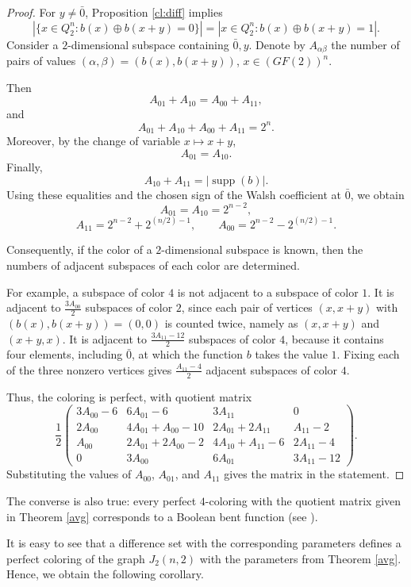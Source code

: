 \documentclass[11pt]{article}
\theoremstyle{definition}
\begin{document}
{{{\begin{proof}
For $y\ne\bar 0$, Proposition \ref{cl:diff}  implies
\[
|\{x\in Q_2^n:b(x)\oplus b(x+y)=0\}|
=
|{x\in Q_2^n:b(x)\oplus b(x+y)=1}|.
\]
Consider a $2$-dimensional subspace containing ${\bar 0,y}$. Denote by $A_{\alpha\beta}$ the number of pairs of values
$(\alpha,\beta)=(b(x),b(x+y))$,
$x\in (GF(2))^n$.

Then
\[
A_{01}+A_{10}=A_{00}+A_{11},
\]
and
\[
A_{01}+A_{10}+A_{00}+A_{11}=2^n.
\]
Moreover, by the change of variable $x\mapsto x+y$,
\[
A_{01}=A_{10}.
\]
Finally,
\[
A_{10}+A_{11}=|\operatorname{supp}(b)|.
\]
Using these equalities and the chosen sign of the Walsh coefficient at $\bar 0$, we obtain
\[
A_{01}=A_{10}=2^{n-2},
\]
\[
A_{11}=2^{n-2}+2^{(n/2)-1},
\qquad
A_{00}=2^{n-2}-2^{(n/2)-1}.
\]

Consequently, if the color of a $2$-dimensional subspace is known, then the numbers of adjacent subspaces of each color are determined.

For example, a subspace of color $4$ is not adjacent to a subspace of color $1$. It is adjacent to
$\frac{3A_{00}}2$
subspaces of color $2$, since each pair of vertices $(x,x+y)$ with
$(b(x),b(x+y))=(0,0)$
is counted twice, namely as $(x,x+y)$ and $(x+y,x)$. It is adjacent to
$\frac{3A_{11}-12}{2}
$
subspaces of color $4$, because it contains four elements, including $\bar 0$, at which the function $b$ takes the value $1$. Fixing each of the three nonzero vertices gives
$\frac{A_{11}-4}{2}$
adjacent subspaces of color $4$.

Thus, the coloring is perfect, with quotient matrix
\[
\frac12
\begin{pmatrix}
3A_{00}-6&6A_{01}-6&3A_{11}&0\\
2A_{00}&4A_{01}+A_{00}-10&2A_{01}+2A_{11}&A_{11}-2\\
A_{00}&2A_{01}+2A_{00}-2&4A_{10}+A_{11}-6&2A_{11}-4\\
0&3A_{00}&6A_{01}&3A_{11}-12
\end{pmatrix}.
\]
Substituting the values of $A_{00}$, $A_{01}$, and $A_{11}$ gives the matrix in the statement.
\end{proof}

The converse is also true: every perfect $4$-coloring with the quotient matrix given in Theorem \ref{avg} corresponds to a Boolean bent function (see \cite{PA20}).

It is easy to see that a difference set with the corresponding parameters defines a perfect coloring of the graph $J_2(n,2)$ with the parameters from Theorem \ref{avg}. Hence, we obtain the following corollary.

}}}
\end{document}
